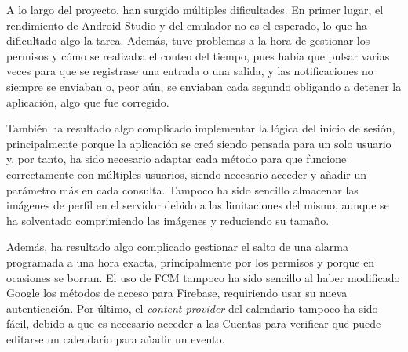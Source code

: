 A lo largo del proyecto, han surgido múltiples dificultades. En primer lugar, el rendimiento de Android Studio y del emulador no es el esperado, lo que ha dificultado algo la tarea. Además, tuve problemas a la hora de gestionar los permisos y cómo se realizaba el conteo del tiempo, pues había que pulsar varias veces para que se registrase una entrada o una salida, y las notificaciones no siempre se enviaban o, peor aún, se enviaban cada segundo obligando a detener la aplicación, algo que fue corregido.

También ha resultado algo complicado implementar la lógica del inicio de sesión, principalmente porque la aplicación se creó siendo pensada para un solo usuario y, por tanto, ha sido necesario adaptar cada método para que funcione correctamente con múltiples usuarios, siendo necesario acceder y añadir un parámetro más en cada consulta. Tampoco ha sido sencillo almacenar las imágenes de perfil en el servidor debido a las limitaciones del mismo, aunque se ha solventado comprimiendo las imágenes y reduciendo su tamaño.

Además, ha resultado algo complicado gestionar el salto de una alarma programada a una hora exacta, principalmente por los permisos y porque en ocasiones se borran. El uso de FCM tampoco ha sido sencillo al haber modificado Google los métodos de acceso para Firebase, requiriendo usar su nueva autenticación. Por último, el \textit{content provider} del calendario tampoco ha sido fácil, debido a que es necesario acceder a las Cuentas para verificar que puede editarse un calendario para añadir un evento.